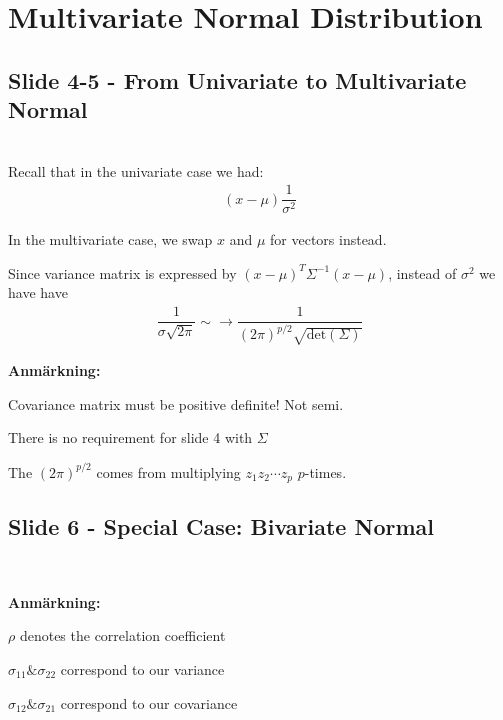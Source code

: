 \section{Multivariate Normal Distribution}
\subsection{Slide 4-5 - From Univariate to Multivariate Normal}\hfill\\
\noindent Recall that in the univariate case we had:
\begin{equation*}
  \begin{gathered}
    (x-\mu)\dfrac{1}{\sigma^2}
  \end{gathered}
\end{equation*}\par
\noindent In the multivariate case, we swap $x$ and $\mu$ for vectors instead.\par
\noindent Since variance matrix is expressed by $(x-\mu)^T\Sigma^{-1}(x-\mu)$, instead of $\sigma^2$ we have have
\begin{equation*}
  \begin{gathered}
    \dfrac{1}{\sigma\sqrt{2\pi}}\sim\rightarrow \dfrac{1}{(2\pi)^{p/2}\sqrt{\text{det}(\Sigma)}}
  \end{gathered}
\end{equation*}
\par\bigskip
\noindent\textbf{Anmärkning:}\par
\noindent Covariance matrix must be positive definite! Not semi.\par
\noindent There is no requirement for slide 4 with $\Sigma$ \par
\noindent The $(2\pi)^{p/2}$ comes from multiplying $z_1z_2\cdots z_p$ $p$-times.
\par\bigskip
\subsection{Slide 6 - Special Case: Bivariate Normal}\hfill\\
\par\bigskip

\noindent\textbf{Anmärkning:} \par
\noindent $\rho$ denotes the correlation coefficient\par
\noindent $\sigma_{11} \& \sigma_{22}$ correspond to our variance\par
\noindent $\sigma_{12} \& \sigma_{21}$ correspond to our covariance\par

